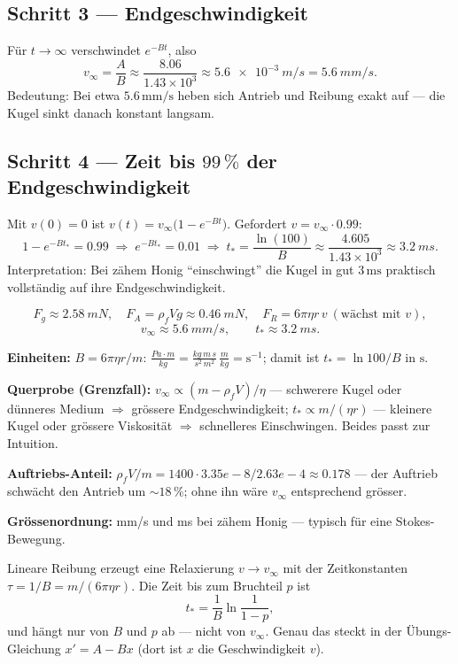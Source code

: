 \subsection*{Schritt 3 --- Endgeschwindigkeit}
Für $t\to\infty$ verschwindet $e^{-Bt}$, also
\[
 v_\infty=\frac{A}{B}
   \approx \frac{8.06}{1.43\times10^3}
   \approx \qty{5.6e-3}{m/s}
   =\qty{5.6}{mm/s}.
\]
Bedeutung: Bei etwa $5.6\,\mathrm{mm/s}$ heben sich Antrieb und Reibung exakt
auf --- die Kugel sinkt danach konstant langsam.

\subsection*{Schritt 4 --- Zeit bis $99\,\%$ der Endgeschwindigkeit}
Mit $v(0)=0$ ist $v(t)=v_\infty\big(1-e^{-Bt}\big)$. Gefordert
$v=v_\infty\cdot 0.99$:
\[
 1-e^{-Bt_*}=0.99
 \;\Rightarrow\;
 e^{-Bt_*}=0.01
 \;\Rightarrow\;
 t_*=\frac{\ln(100)}{B}
   \approx \frac{4.605}{1.43\times10^3}
   \approx \qty{3.2}{ms}.
\]
Interpretation: Bei zähem Honig ``einschwingt'' die Kugel in gut
$3\,\mathrm{ms}$ praktisch vollständig auf ihre Endgeschwindigkeit.

\begin{ergebnis}
\begin{equation*}
 F_g\approx\qty{2.58}{mN},\quad
 F_A=\rho_f V g\approx\qty{0.46}{mN},\quad
 F_R=6\pi\eta r\,v\ (\text{wächst mit } v),
\end{equation*}
\begin{equation*}
 v_\infty\approx\qty{5.6}{mm/s},
 \qquad
 t_*\approx\qty{3.2}{ms}.
\end{equation*}
\end{ergebnis}

\begin{kontrolle}
\textbf{Einheiten:} $B=6\pi\eta r/m$:
$\frac{Pa\cdot m}{kg}=\frac{kg\,m\,s}{s^2\,m^2}\,\frac{m}{kg}=\mathrm{s^{-1}}$;
damit ist $t_*=\ln100/B$ in $\mathrm{s}$. \checkmark

\textbf{Querprobe (Grenzfall):} $v_\infty\propto (m-\rho_f V)/\eta$ --- schwerere
Kugel oder dünneres Medium $\Rightarrow$ grössere Endgeschwindigkeit;
$t_*\propto m/(\eta r)$ --- kleinere Kugel oder grössere Viskosität
$\Rightarrow$ schnelleres Einschwingen. Beides passt zur Intuition.

\textbf{Auftriebs-Anteil:} $\rho_f V/m = 1400\cdot 3.35e-8 / 2.63e-4\approx
0.178$ --- der Auftrieb schwächt den Antrieb um $\sim 18\,\%$; ohne ihn wäre
$v_\infty$ entsprechend grösser.

\textbf{Grössenordnung:} mm/s und ms bei zähem Honig --- typisch für eine
Stokes-Bewegung. \checkmark
\end{kontrolle}

\begin{merksatz}
Lineare Reibung erzeugt eine Relaxierung $v\to v_\infty$ mit der
Zeitkonstanten $\tau=1/B=m/(6\pi\eta r)$. Die Zeit bis zum Bruchteil $p$ ist
\[
 t_*=\frac{1}{B}\ln\frac{1}{1-p},
\]
und hängt nur von $B$ und $p$ ab --- nicht von $v_\infty$. Genau das steckt
in der Übungs-Gleichung $x'=A-Bx$ (dort ist $x$ die Geschwindigkeit $v$).
\end{merksatz}
